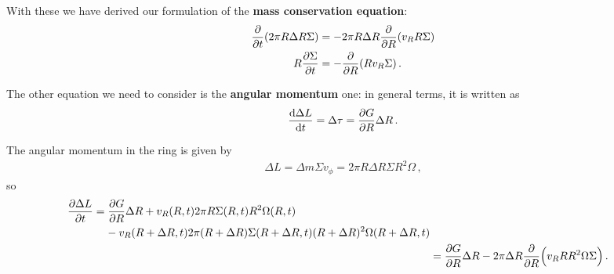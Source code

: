 \documentclass[main.tex]{subfiles}
\begin{document}
With these we have derived our formulation of the \textbf{mass conservation equation}:
%
\begin{align}
\pdv{}{t} \qty(2 \pi R \Delta R \Sigma ) &= - 2 \pi R \Delta R 
\pdv{}{R} \qty(v_R R \Sigma ) \\
R \pdv{\Sigma }{t} &= - \pdv{}{R} \qty(R v_R \Sigma )
\,.
\end{align}

The other equation we need to consider is the \textbf{angular momentum} one: in general terms, it is written as 
%
\begin{align}
\dv{\Delta L}{t} = \Delta \tau = \pdv{ G}{R} \Delta R
\,.
\end{align}

The angular momentum in the ring is given by 
%
\begin{align}
\Delta L = \Delta m \Sigma v_\phi =  2 \pi R \Delta R \Sigma R^2 \Omega 
\,,
\end{align}
%
so 
%
\begin{align}
\begin{split}
\pdv{\Delta L}{t}
&= \pdv{G}{R} \Delta R 
+ v_R( R, t) 2 \pi R \Sigma (R, t) R^2\Omega (R, t) \\
&\phantom{=}\ - v_R(R + \Delta R, t) 2 \pi (R + \Delta R) \Sigma (R + \Delta R, t)( R + \Delta R)^2 \Omega (R + \Delta R, t)
\end{split}  \\
&= \pdv{G}{R} \Delta R - 2 \pi \Delta R \pdv{}{R} \qty(v_R R R^2 \Omega \Sigma )
\,.
\end{align}
\end{document}

